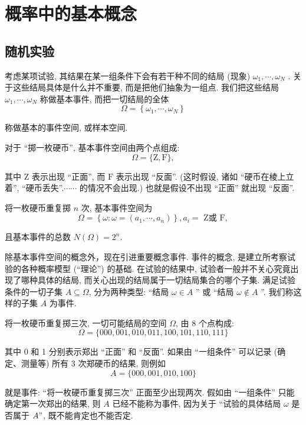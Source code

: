\section{概率中的基本概念}
\subsection{随机实验}

考虑某项试验, 其结果在某一组条件下会有若干种不同的结局 (现象) $\omega_1, \cdots, \omega_N$ . 关于这些结局具体是什么并不重要, 而是把他们抽象为一组点. 我们把这些结局 $\omega_1, \cdots, \omega_N$ 称做基本事件, 而把一切结局的全体
$$
\Omega=\left\{\omega_1, \cdots, \omega_N\right\}
$$

称做基本的事件空间, 或样本空间.

\begin{example}
    对于 “掷一枚硬币”, 基本事件空间由两个点组成:
$$
\Omega=\{\mathrm{Z}, \mathrm{F}\},
$$

其中 Z 表示出现 “正面”, 而 $\mathrm{F}$ 表示出现 “反面”. (这时假设, 诸如 “硬币在棱上立着”, “硬币丢失”.$\cdots \cdots$ 的情况不会出现.) 也就是假设不出现 “正面” 就出现 “反面”.

    将一枚硬币重复掷 $n$ 次, 基本事件空间为
$$
\Omega=\left\{\omega: \omega=\left(a_1, \cdots, a_n\right)\right\}, a_i=\text { Z或 } \mathrm{F},
$$

且基本事件的总数 $N(\Omega)=2^n$.
\end{example}

除基本事件空间的概念外，现在引进重要概念事件. 事件的概念, 是建立所考察试验的各种概率模型 (“理论”) 的基础. 在试验的结果中, 试验者一般并不关心究竟出现了哪种具体的结局, 而关心出现的结局属于一切结局集合的哪个子集. 满足试验条件的一切子集 $A \subseteq \Omega$, 分为两种类型: “结局 $\omega \in A$ ” 或 “结局 $\omega \notin A$ ”. 我们称这样的子集 $A$ 为事件.

\begin{example}
    将一枚硬币重复掷三次, 一切可能结局的空间 $\Omega$, 由 8 个点构成:
$$
\Omega=\{000,001,010,011,100,101,110,111\}
$$

其中 0 和 1 分别表示郑出 “正面” 和 “反面”. 如果由 “一组条件” 可以记录 (确定、测量等) 所有 3 次郑硬币的结果, 则例如
$$
A=\{000,001,010,100\}
$$

就是事件: “将一枚硬币重复掷三次” 正面至少出现两次. 假如由 “一组条件” 只能确定第一次郑出的结果, 则 $A$ 已经不能称为事件, 因为关于 “试验的具体结局 $\omega$ 是否属于 $A "$, 既不能肯定也不能否定.
\end{example}

